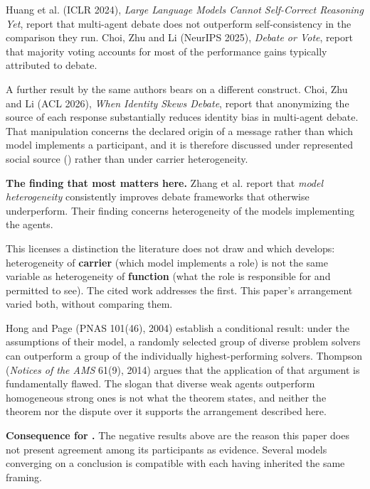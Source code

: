 \gcheck{} Huang et al. (ICLR 2024), \emph{Large Language Models Cannot Self-Correct Reasoning Yet}, report that multi-agent debate does not outperform self-consistency in the comparison they run. \gcheck{} Choi, Zhu and Li (NeurIPS 2025), \emph{Debate or Vote}, report that majority voting accounts for most of the performance gains typically attributed to debate.
\nocite{huang2024selfcorrect,choi2025debateorvote}

A further result by the same authors bears on a different construct. \gcheck{} Choi, Zhu and Li (ACL 2026), \emph{When Identity Skews Debate}, report that anonymizing the source of each response substantially reduces identity bias in multi-agent debate. That manipulation concerns the declared origin of a message rather than which model implements a participant, and it is therefore discussed under represented social source () rather than under carrier heterogeneity.
\nocite{choi2026identity}

\textbf{The finding that most matters here.} \gcheck{} Zhang et al. report that \emph{model heterogeneity} consistently improves debate frameworks that otherwise underperform. Their finding concerns heterogeneity of the models implementing the agents.
\nocite{zhang2025overvaluing}

This licenses a distinction the literature does not draw and which  develops: heterogeneity of \textbf{carrier} (which model implements a role) is not the same variable as heterogeneity of \textbf{function} (what the role is responsible for and permitted to see). The cited work addresses the first. This paper's arrangement varied both, without comparing them.

\gcheck{} Hong and Page (PNAS 101(46), 2004) establish a conditional result: under the assumptions of their model, a randomly selected group of diverse problem solvers can outperform a group of the individually highest-performing solvers. \gcheck{} Thompson (\emph{Notices of the AMS} 61(9), 2014) argues that the application of that argument is fundamentally flawed. The slogan that diverse weak agents outperform homogeneous strong ones is not what the theorem states, and neither the theorem nor the dispute over it supports the arrangement described here.
\nocite{hong2004diverse,thompson2014diversity}

\textbf{Consequence for .} The negative results above are the reason this paper does not present agreement among its participants as evidence. Several models converging on a conclusion is compatible with each having inherited the same framing.


